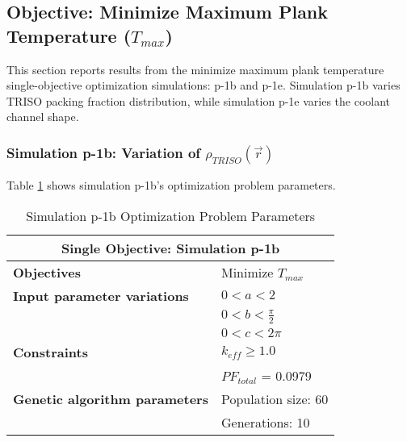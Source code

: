 \subsection{Objective: Minimize Maximum Plank Temperature ($T_{max}$)}
\label{sec:plank-1-obj-temp}
This section reports results from the minimize maximum plank temperature single-objective
optimization simulations: p-1b and p-1e. 
Simulation p-1b varies \gls{TRISO} packing fraction distribution, while simulation p-1e 
varies the coolant channel shape. 

\subsubsection{Simulation p-1b: Variation of $\rho_{TRISO}(\vec{r})$}
Table \ref{tab:simulationp1b} shows simulation p-1b's optimization problem parameters. 
\begin{table}[htbp!]
    \centering
    \onehalfspacing
    \caption{Simulation p-1b Optimization Problem Parameters}
	\label{tab:simulationp1b}
    \footnotesize
    \begin{tabular}{l|p{3cm}}
    \hline 
    \multicolumn{2}{c}{\textbf{Single Objective: Simulation p-1b}} \\
    \hline 
    \textbf{Objectives} & Minimize $T_{max}$ \\
    \hline 
    \textbf{Input parameter variations} & $0<a<2$ \\
    & $0<b<\frac{\pi}{2}$ \\
    & $0<c<2\pi$ \\
    \hline
    \textbf{Constraints} & $k_{eff} \geq 1.0$\\ 
    & $PF_{total}$ = 0.0979\\
    \hline 
    \textbf{Genetic algorithm parameters} & Population size: 60 \\
    & Generations: 10 \\
    \hline
    \end{tabular}
\end{table}

